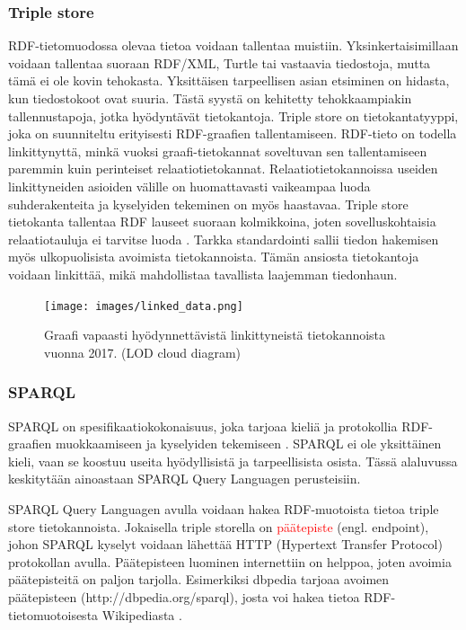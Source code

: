 \documentclass[finnish, 12pt, a4paper, elec, utf8, pdfa, online]{aaltothesis}
\begin{document}
\subsubsection{Triple store}
RDF-tietomuodossa olevaa tietoa voidaan tallentaa muistiin. Yksinkertaisimillaan voidaan tallentaa suoraan RDF/XML, Turtle tai vastaavia tiedostoja, mutta tämä ei ole kovin tehokasta. Yksittäisen tarpeellisen asian etsiminen on hidasta, kun tiedostokoot ovat suuria. Tästä syystä on kehitetty tehokkaampiakin tallennustapoja, jotka hyödyntävät tietokantoja. Triple store on tietokantatyyppi, joka on suunniteltu erityisesti RDF-graafien tallentamiseen. RDF-tieto on todella linkittynyttä, minkä vuoksi graafi-tietokannat soveltuvan sen tallentamiseen paremmin kuin perinteiset relaatiotietokannat. Relaatiotietokannoissa useiden linkittyneiden asioiden välille on huomattavasti vaikeampaa luoda suhderakenteita ja kyselyiden tekeminen on myös haastavaa. Triple store tietokanta tallentaa RDF lauseet suoraan kolmikkoina, joten sovelluskohtaisia relaatiotauluja ei tarvitse luoda \cite{triplestore}. Tarkka standardointi sallii tiedon hakemisen myös ulkopuolisista avoimista tietokannoista. Tämän ansiosta tietokantoja voidaan linkittää, mikä mahdollistaa tavallista laajemman tiedonhaun.

\begin{figure}[htb]
\centering
\texttt{[image: images/linked\_data.png]}
\caption{Graafi vapaasti hyödynnettävistä linkittyneistä tietokannoista vuonna 2017. (LOD cloud diagram) \cite{LOD_cloud} \label{images/linked_data}}
\end{figure}
\clearpage

\subsubsection{SPARQL}

SPARQL on spesifikaatiokokonaisuus, joka tarjoaa kieliä ja protokollia RDF-graafien muokkaamiseen ja kyselyiden tekemiseen \cite{sparql}. SPARQL ei ole yksittäinen kieli, vaan se koostuu useita hyödyllisistä ja tarpeellisista osista. Tässä alaluvussa keskitytään ainoastaan SPARQL Query Languagen perusteisiin.

SPARQL Query Languagen avulla voidaan hakea RDF-muotoista tietoa triple store tietokannoista. Jokaisella triple storella on \textcolor{red}{päätepiste} (engl. endpoint), johon SPARQL kyselyt voidaan lähettää HTTP (Hypertext Transfer Protocol) protokollan avulla. Päätepisteen luominen internettiin on helppoa, joten avoimia päätepisteitä on paljon tarjolla. Esimerkiksi dbpedia tarjoaa avoimen päätepisteen (http://dbpedia.org/sparql), josta voi hakea tietoa RDF-tietomuotoisesta Wikipediasta \cite{Antoniou}.
\end{document}
